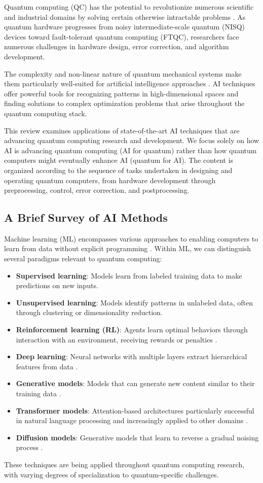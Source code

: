 Quantum computing (QC) has the potential to revolutionize numerous scientific and industrial domains by solving certain otherwise intractable problems \cite{alexeev2021quantum}. As quantum hardware progresses from noisy intermediate-scale quantum (NISQ) devices toward fault-tolerant quantum computing (FTQC), researchers face numerous challenges in hardware design, error correction, and algorithm development.

The complexity and non-linear nature of quantum mechanical systems make them particularly well-suited for artificial intelligence approaches \cite{dunjko2023artificial}. AI techniques offer powerful tools for recognizing patterns in high-dimensional spaces and finding solutions to complex optimization problems that arise throughout the quantum computing stack.

This review examines applications of state-of-the-art AI techniques that are advancing quantum computing research and development. We focus solely on how AI is advancing quantum computing (AI for quantum) rather than how quantum computers might eventually enhance AI (quantum for AI). The content is organized according to the sequence of tasks undertaken in designing and operating quantum computers, from hardware development through preprocessing, control, error correction, and postprocessing.

\subsection{A Brief Survey of AI Methods}
Machine learning (ML) encompasses various approaches to enabling computers to learn from data without explicit programming \cite{janiesch2021machine}. Within ML, we can distinguish several paradigms relevant to quantum computing:

\begin{itemize}
    \item \textbf{Supervised learning}: Models learn from labeled training data to make predictions on new inputs.
    \item \textbf{Unsupervised learning}: Models identify patterns in unlabeled data, often through clustering or dimensionality reduction.
    \item \textbf{Reinforcement learning (RL)}: Agents learn optimal behaviors through interaction with an environment, receiving rewards or penalties \cite{arulkumaran2017deep, shakya2023reinforcement}.
    \item \textbf{Deep learning}: Neural networks with multiple layers extract hierarchical features from data \cite{lecun2015deep}.
    \item \textbf{Generative models}: Models that can generate new content similar to their training data \cite{bernardo2007generative}.
    \item \textbf{Transformer models}: Attention-based architectures particularly successful in natural language processing and increasingly applied to other domains \cite{vaswani2017attention}.
    \item \textbf{Diffusion models}: Generative models that learn to reverse a gradual noising process \cite{ho2020denoising}.
\end{itemize}

These techniques are being applied throughout quantum computing research, with varying degrees of specialization to quantum-specific challenges. 